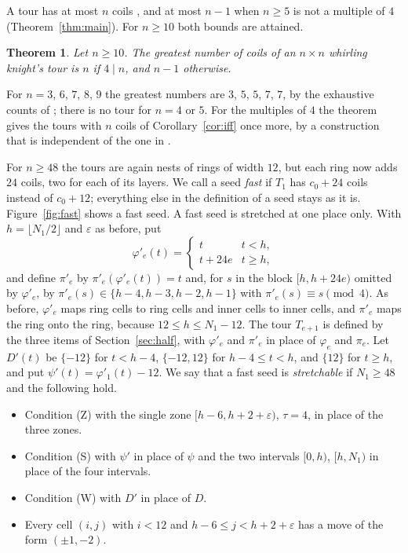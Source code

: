 \documentclass[11pt]{amsart}
\newtheorem{theorem}{Theorem}
\theoremstyle{remark}
\begin{document}
A tour has at most $n$ coils \cite[exercise 229(c)]{knuth}, and at most $n-1$ when $n\ge5$ is not a multiple of $4$
(Theorem~\ref{thm:main}). For $n\ge10$ both bounds are attained.

\begin{theorem}\label{thm:max}
Let $n\ge10$. The greatest number of coils of an $n\times n$ whirling knight's tour is $n$ if $4\mid n$, and $n-1$
otherwise.
\end{theorem}
For $n=3$, $6$, $7$, $8$, $9$ the greatest numbers are $3$, $5$, $5$, $7$, $7$, by the exhaustive counts of
\cite[answer 229]{knuth}; there is no tour for $n=4$ or $5$. For the multiples of $4$ the theorem gives the tours with $n$ coils of
Corollary~\ref{cor:iff} once more, by a construction that is independent of the one in \cite[answer 232]{knuth}.

For $n\ge48$ the tours are again nests of rings of width $12$, but each ring now adds $24$ coils, two for each of
its layers. We call a seed \emph{fast} if $T_1$ has $c_0+24$ coils instead of $c_0+12$;
everything else in the definition of a seed stays as it is. Figure~\ref{fig:fast} shows a fast seed. A fast seed is
stretched at one place only. With
$h=\lfloor N_1/2\rfloor$ and $\varepsilon$ as before, put
\[ \varphi'_e(t)=\begin{cases} t & t<h,\\ t+24e & t\ge h,\end{cases} \]
and define $\pi'_e$ by $\pi'_e(\varphi'_e(t))=t$ and, for $s$ in the block $[h,h+24e)$ omitted by $\varphi'_e$, by
$\pi'_e(s)\in\{h-4,h-3,h-2,h-1\}$ with $\pi'_e(s)\equiv s\pmod 4$. As before, $\varphi'_e$ maps ring cells to
ring cells and inner cells to inner cells, and $\pi'_e$ maps the ring onto the ring, because $12\le h\le N_1-12$.
The tour $T_{e+1}$ is defined by the three items
of Section~\ref{sec:half}, with $\varphi'_e$ and $\pi'_e$ in place of $\varphi_e$ and $\pi_e$. Let $D'(t)$ be
$\{-12\}$ for $t<h-4$, $\{-12,12\}$ for $h-4\le t<h$, and $\{12\}$ for $t\ge h$, and put $\psi'(t)=\varphi'_1(t)-12$.
We say that a fast seed is \emph{stretchable} if $N_1\ge48$ and the following hold.
\begin{itemize}
\item[(Z$'$)] Condition (Z) with the single zone $[h-6,h+2+\varepsilon)$, $\tau=4$, in place of the three zones.
\item[(S$'$)] Condition (S) with $\psi'$ in place of $\psi$ and the two intervals $[0,h)$, $[h,N_1)$ in place of
the four intervals.
\item[(W$'$)] Condition (W) with $D'$ in place of $D$.
\item[(C$'$)] Every cell $(i,j)$ with $i<12$ and $h-6\le j<h+2+\varepsilon$ has a move of the form $(\pm1,-2)$.
\end{itemize}
\end{document}
